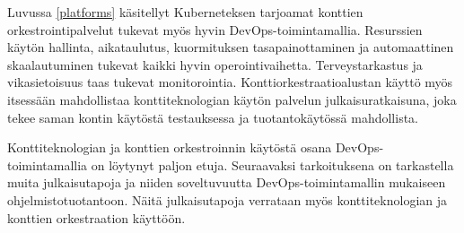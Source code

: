 Luvussa \ref{platforms} käsitellyt Kuberneteksen tarjoamat konttien orkestrointipalvelut tukevat myös hyvin DevOps-toimintamallia.
Resurssien käytön hallinta, aikataulutus, kuormituksen tasapainottaminen ja automaattinen skaalautuminen tukevat kaikki hyvin operointivaihetta.
Terveystarkastus ja vikasietoisuus taas tukevat monitorointia.
Konttiorkestraatioalustan käyttö myös itsessään mahdollistaa konttiteknologian käytön palvelun julkaisuratkaisuna, joka tekee saman kontin käytöstä testauksessa ja tuotantokäytössä mahdollista.

Konttiteknologian ja konttien orkestroinnin käytöstä osana DevOps-toimintamallia on löytynyt paljon etuja.
Seuraavaksi tarkoituksena on tarkastella muita julkaisutapoja ja niiden soveltuvuutta DevOps-toimintamallin mukaiseen ohjelmistotuotantoon.
Näitä julkaisutapoja verrataan myös konttiteknologian ja konttien orkestraation käyttöön.

